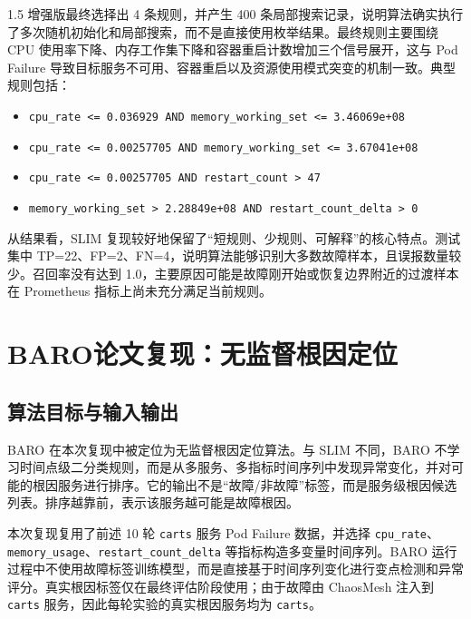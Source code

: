 \documentclass[a4paper,12pt]{report}
\begin{document}
\begin{spacing}{1.5}
增强版最终选择出 4 条规则，并产生 400 条局部搜索记录，说明算法确实执行了多次随机初始化和局部搜索，而不是直接使用枚举结果。最终规则主要围绕 CPU 使用率下降、内存工作集下降和容器重启计数增加三个信号展开，这与 Pod Failure 导致目标服务不可用、容器重启以及资源使用模式突变的机制一致。典型规则包括：

\begin{itemize}
    \item \texttt{cpu\_rate <= 0.036929 AND memory\_working\_set <= 3.46069e+08}
    \item \texttt{cpu\_rate <= 0.00257705 AND memory\_working\_set <= 3.67041e+08}
    \item \texttt{cpu\_rate <= 0.00257705 AND restart\_count > 47}
    \item \texttt{memory\_working\_set > 2.28849e+08 AND restart\_count\_delta > 0}
\end{itemize}

从结果看，SLIM 复现较好地保留了“短规则、少规则、可解释”的核心特点。测试集中 TP=22、FP=2、FN=4，说明算法能够识别大多数故障样本，且误报数量较少。召回率没有达到 1.0，主要原因可能是故障刚开始或恢复边界附近的过渡样本在 Prometheus 指标上尚未充分满足当前规则。

\section{BARO论文复现：无监督根因定位}

\subsection{算法目标与输入输出}

BARO 在本次复现中被定位为无监督根因定位算法\cite{baro2024}。与 SLIM 不同，BARO 不学习时间点级二分类规则，而是从多服务、多指标时间序列中发现异常变化，并对可能的根因服务进行排序。它的输出不是“故障/非故障”标签，而是服务级根因候选列表。排序越靠前，表示该服务越可能是故障根因。

本次复现复用了前述 10 轮 \texttt{carts} 服务 Pod Failure 数据，并选择 \texttt{cpu\_rate}、\texttt{memory\_usage}、\texttt{restart\_count\_delta} 等指标构造多变量时间序列。BARO 运行过程中不使用故障标签训练模型，而是直接基于时间序列变化进行变点检测和异常评分。真实根因标签仅在最终评估阶段使用；由于故障由 ChaosMesh 注入到 \texttt{carts} 服务，因此每轮实验的真实根因服务均为 \texttt{carts}。


\end{spacing}
\end{document}
